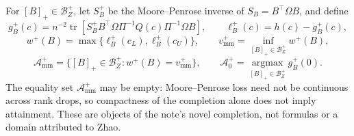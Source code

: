 For \([B]_+\in\mathcal B_Z^+\), let \(S_B^+\) be the Moore--Penrose inverse of \(S_B=B^{\top}\Omega B\), and define
\[
g_B^+(c)=n^{-2}\operatorname{tr}\!\left[S_B^+B^{\top}\Omega\Pi^{-1}Q(c)\Pi^{-1}\Omega B\right],
\qquad \ell_B^+(c)=h(c)-g_B^+(c),
\]
\[
w^+(B)=\max\{\ell_B^+(c_L),\ell_B^+(c_U)\},
\qquad v_{\mathrm{mm}}^+=\inf_{[B]_+\in\mathcal B_Z^+}w^+(B),
\]
\[
\mathcal A_{\mathrm{mm}}^+
=\{[B]_+\in\mathcal B_Z^+:w^+(B)=v_{\mathrm{mm}}^+\},
\qquad
\mathcal A_0^+=\operatorname*{argmax}_{[B]_+\in\mathcal B_Z^+}g_B^+(0).
\]
The equality set \(\mathcal A_{\mathrm{mm}}^+\) may be empty: Moore--Penrose loss need not be continuous across rank drops, so compactness of the completion alone does not imply attainment.  These are objects of the note's novel completion, not formulas or a domain attributed to Zhao.